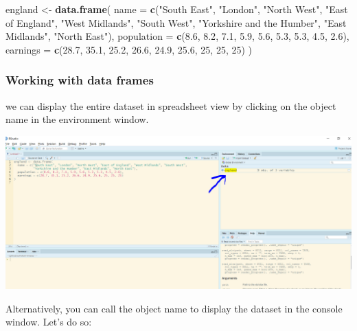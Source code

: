 \documentclass[]{article}
\newenvironment{Shaded}{\begin{snugshade}}{\end{snugshade}}
\newcommand{\DataTypeTok}[1]{\textcolor[rgb]{0.13,0.29,0.53}{#1}}
\newcommand{\DecValTok}[1]{\textcolor[rgb]{0.00,0.00,0.81}{#1}}
\newcommand{\FloatTok}[1]{\textcolor[rgb]{0.00,0.00,0.81}{#1}}
\newcommand{\KeywordTok}[1]{\textcolor[rgb]{0.13,0.29,0.53}{\textbf{#1}}}
\newcommand{\NormalTok}[1]{#1}
\newcommand{\StringTok}[1]{\textcolor[rgb]{0.31,0.60,0.02}{#1}}
\begin{document}
\begin{Shaded}
\begin{Highlighting}[]
\NormalTok{england <-}\StringTok{ }\KeywordTok{data.frame}\NormalTok{(}
  \DataTypeTok{name =} \KeywordTok{c}\NormalTok{(}\StringTok{"South East"}\NormalTok{, }\StringTok{"London"}\NormalTok{, }\StringTok{"North West"}\NormalTok{, }\StringTok{"East of England"}\NormalTok{, }\StringTok{"West Midlands"}\NormalTok{, }\StringTok{"South West"}\NormalTok{,}
           \StringTok{"Yorkshire and the Humber"}\NormalTok{, }\StringTok{"East Midlands"}\NormalTok{, }\StringTok{"North East"}\NormalTok{),}
  \DataTypeTok{population =} \KeywordTok{c}\NormalTok{(}\FloatTok{8.6}\NormalTok{, }\FloatTok{8.2}\NormalTok{, }\FloatTok{7.1}\NormalTok{, }\FloatTok{5.9}\NormalTok{, }\FloatTok{5.6}\NormalTok{, }\FloatTok{5.3}\NormalTok{, }\FloatTok{5.3}\NormalTok{, }\FloatTok{4.5}\NormalTok{, }\FloatTok{2.6}\NormalTok{),}
  \DataTypeTok{earnings =} \KeywordTok{c}\NormalTok{(}\FloatTok{28.7}\NormalTok{, }\FloatTok{35.1}\NormalTok{, }\FloatTok{25.2}\NormalTok{, }\FloatTok{26.6}\NormalTok{, }\FloatTok{24.9}\NormalTok{, }\FloatTok{25.6}\NormalTok{, }\DecValTok{25}\NormalTok{, }\DecValTok{25}\NormalTok{, }\DecValTok{25}\NormalTok{)}
\NormalTok{)}
\end{Highlighting}
\end{Shaded}

\hypertarget{working-with-data-frames}{%
\subsubsection{Working with data frames}\label{working-with-data-frames}}

we can display the entire dataset in spreadsheet view by clicking on the object name in the environment window.

\includegraphics{./img/dataframe_in_spreadsheet_view.png}

Alternatively, you can call the object name to display the dataset in the console window. Let's do so:
\end{document}
